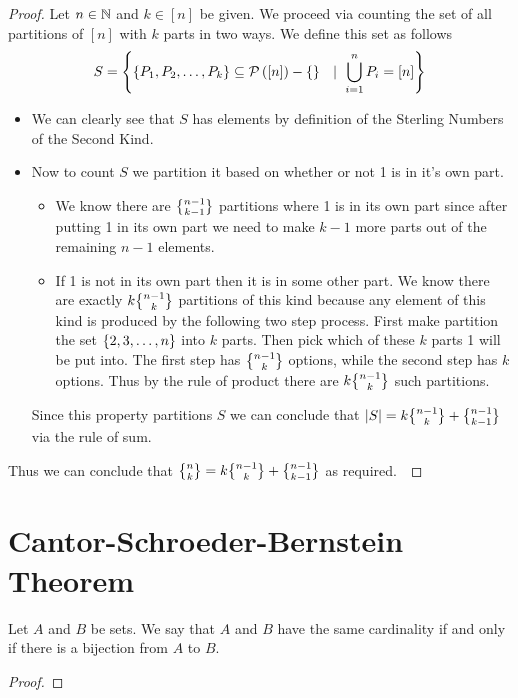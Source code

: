         \begin{proof}
            Let $n \in \mathbb{N}$ and $k \in [n]$ be given.
            We proceed via counting the set of all partitions of $[n]$ with $k$ parts
            in two ways. We define this set as follows
            \[
                S = \left\{\left\{P_1, P_2, \dots, P_k\right\} \subseteq \mathcal{P}\left([n]\right) - \left\{\right\} \  \ \mid \ \displaystyle\bigcup_{i = 1}^{n} P_i = [n]\right\}
            \]
            \begin{itemize}
                \item
                    We can clearly see that $S$ has  elements by definition of
                    the Sterling Numbers of the Second Kind.
                \item
                    Now to count $S$ we partition it based on whether or not 1 is in
                    it's own part.
                    \begin{itemize}
                        \item
                            We know there are $\npartk{n - 1}{k - 1}$ partitions
                            where 1 is in its own part since after putting 1 in its own part we need
                            to make $k - 1$ more parts out of the remaining $n - 1$ elements.
                        \item
                            If 1 is not in its own part then it is in some other part. We
                            know there are exactly $k \npartk{n - 1}{k}$ partitions of this
                            kind because any element of this kind is produced by the following
                            two step process. First make partition the set $\left\{2, 3, \dots, n\right\}$
                            into $k$ parts. Then pick which of these $k$ parts 1 will be put into.
                            The first step has $\npartk{n - 1}{k}$ options, while the second step
                            has $k$ options. Thus by the rule of product there are $k \npartk{n - 1}{k}$
                            such partitions.
                    \end{itemize}
                    Since this property partitions $S$ we can conclude that
                    $|S| = k \npartk{n - 1}{k} + \npartk{n - 1}{k - 1}$ via the rule of sum.
            \end{itemize}
            Thus we can conclude that $\npartk{n}{k} = k \npartk{n - 1}{k} + \npartk{n - 1}{k - 1}$
            as required.~\QED
        \end{proof}
    \section{Cantor-Schroeder-Bernstein Theorem}
        \begin{definition}
            Let $A$ and $B$ be sets. We say that $A$ and $B$ have the same cardinality if and
            only if there is a bijection from $A$ to $B$.
        \end{definition}
        \begin{theorem}
        \end{theorem}
        \begin{proof}
        \end{proof}

